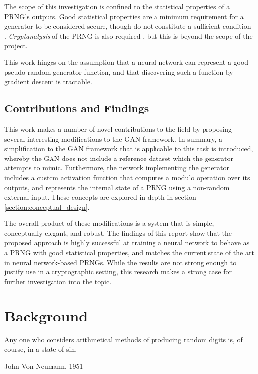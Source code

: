 \documentclass[12pt, titlepage]{report}
\theoremstyle{definition}
\begin{document}
The scope of this investigation is confined to the statistical properties of a PRNG's outputs. Good statistical properties are a minimum requirement for a generator to be considered secure, though do not constitute a sufficient condition \cite[p. 170]{menezes1996handbook}. \emph{Cryptanalysis} of the PRNG is also required \cite[Abstract]{rukhin2001statistical}\cite[p. 3-6]{kelsey1998cryptanalytic}, but this is beyond the scope of the project.

This work hinges on the assumption that a neural network can represent a good pseudo-random generator function, and that discovering such a function by gradient descent is tractable.


\section{Contributions and Findings} 
This work makes a number of novel contributions to the field by proposing several interesting modifications to the GAN framework. In summary, a simplification to the GAN framework that is applicable to this task is introduced, whereby the GAN does not include a reference dataset which the generator attempts to mimic. Furthermore, the network implementing the generator includes a custom activation function that computes a modulo operation over its outputs, and represents the internal state of a PRNG using a non-random external input. These concepts are explored in depth in section \ref{section:conceptual_design}. 

The overall product of these modifications is a system that is simple, conceptually elegant, and robust. The findings of this report show that the proposed approach is highly successful at training a neural network to behave as a PRNG with good statistical properties, and matches the current state of the art in neural network-based PRNGs. While the results are not strong enough to justify use in a cryptographic setting, this research makes a strong case for further investigation into the topic.


\chapter{Background}\label{chapter:background}
\epigraph{Any one who considers arithmetical methods of producing random digits is, of course, in a state of sin.}{John Von Neumann, 1951}
\end{document}
